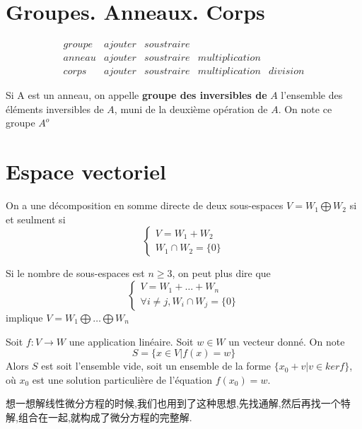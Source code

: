 \documentclass{book}
\begin{document}
\chapter{Groupes. Anneaux. Corps}
$$
\begin{array}{l|llll}
groupe & ajouter & soustraire &&\\
\hline
anneau & ajouter & soustraire & multiplication & \\
\hline
corps & ajouter & soustraire & multiplication & division
\end{array}
$$


Si A est un anneau, on appelle  {\bf groupe des inversibles de} $A$ l'ensemble des \'el\'ements inversibles de $A$, muni de la deuxi\`eme op\'eration de $A$. On note ce groupe $A^o$

\chapter{Espace vectoriel}
\begin{theorem}
  On a une d\'ecomposition en somme directe de deux sous-espaces $ V = W_1 \bigoplus W_2$  si et seulment si
  $$
    \begin{cases}
    V=W_1+W_2 \\
    W_1\cap W_2=\{0\}
    \end{cases}
  $$
\end{theorem}
\begin{attention}
  Si le nombre de sous-espaces est $n\geqslant 3$, on peut plus dire que
  $$
    \begin{cases}
    V=W_1+\dots+W_n \\
    \forall i \neq j,W_i\cap W_j=\{0\}
    \end{cases}
  $$
  implique $ V = W_1 \bigoplus \dots \bigoplus W_n$
\end{attention}

\begin{theorem}
  Soit $f:V \rightarrow W$ une application lin\'eaire. Soit $w \in W$ un vecteur donn\'e. On note
  $$
  S=\{x \in V|f(x)=w\}
  $$
  Alors $S$ est soit l'ensemble vide, soit un ensemble de la forme $\{x_0+v|v \in ker f\}$, o\`u $x_0$ est une solution particuli\`ere de l'\'equation $f(x_0)=w$.
\end{theorem}
\begin{note}
  想一想解线性微分方程的时候,我们也用到了这种思想,先找通解,然后再找一个特解,组合在一起,就构成了微分方程的完整解.
\end{note}
\end{document}
